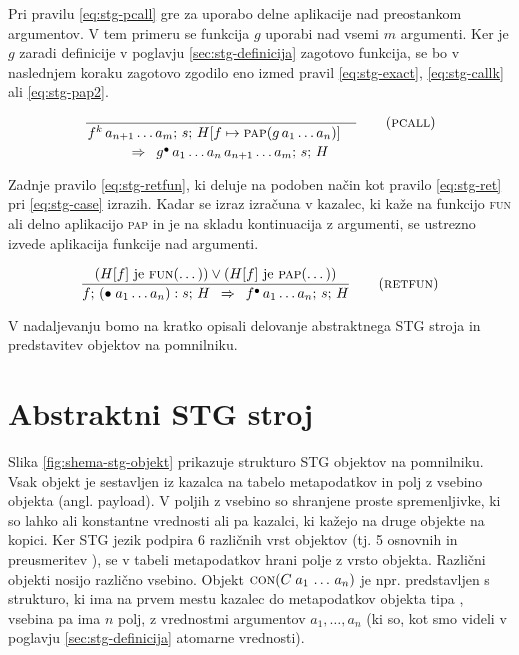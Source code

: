 Pri pravilu \ref{eq:stg-pcall} gre za uporabo delne aplikacije nad preostankom argumentov. V tem primeru se funkcija $g$ uporabi nad vsemi $m$ argumenti. Ker je $g$ zaradi definicije v poglavju \ref{sec:stg-definicija} zagotovo funkcija, se bo v naslednjem koraku zagotovo zgodilo eno izmed pravil \ref{eq:stg-exact}, \ref{eq:stg-callk} ali \ref{eq:stg-pap2}.

\begin{equation}
	\linfer[pcall]{}{
		f^k \, a_{n + 1} \dots a_m ; \, s; \, H[f \mapsto \textsc{pap}(g \, a_1 \dots a_n)]
	}{
		g^\bullet \, a_1 \dots a_n \, a_{n + 1} \dots a_m; \, s; \, H
	}
\label{eq:stg-pcall}
\end{equation}

Zadnje pravilo \ref{eq:stg-retfun}, ki deluje na podoben način kot pravilo \ref{eq:stg-ret} pri \ref{eq:stg-case} izrazih. Kadar se izraz izračuna v kazalec, ki kaže na funkcijo \textsc{fun} ali delno aplikacijo \textsc{pap} in je na skladu kontinuacija z argumenti, se ustrezno izvede aplikacija funkcije nad argumenti.

\begin{equation}
	\infer[retfun]{
		(\text{$H[f]$ je \textsc{fun}(\dots)}) \lor (\text{$H[f]$ je \textsc{pap}(\dots)})
	}{
		f; \, (\bullet \; a_1 \dots a_n) : s; \, H
	}{
		f^\bullet \, a_1 \dots a_n; \, s; \, H
	}
\label{eq:stg-retfun}
\end{equation}

V nadaljevanju bomo na kratko opisali delovanje abstraktnega STG stroja in predstavitev objektov na pomnilniku.

\section{Abstraktni STG stroj}
\label{sec:abstraktni-stg-stroj}

Slika \ref{fig:shema-stg-objekt} prikazuje strukturo STG objektov na pomnilniku. Vsak objekt je sestavljen iz kazalca na tabelo metapodatkov in polj z vsebino objekta (angl. payload). V poljih z vsebino so shranjene proste spremenljivke, ki so lahko ali konstantne vrednosti ali pa kazalci, ki kažejo na druge objekte na kopici. Ker STG jezik podpira 6 različnih vrst objektov (tj. 5 osnovnih in preusmeritev ), se v tabeli metapodatkov hrani polje z vrsto objekta. Različni objekti nosijo različno vsebino. Objekt $\textsc{con}(C \; a_1 \, \dots \, a_n)$ je npr. predstavljen s strukturo, ki ima na prvem mestu kazalec do metapodatkov objekta tipa , vsebina pa ima $n$ polj, z vrednostmi argumentov $a_1, \dots, a_n$ (ki so, kot smo videli v poglavju \ref{sec:stg-definicija} atomarne vrednosti). 

